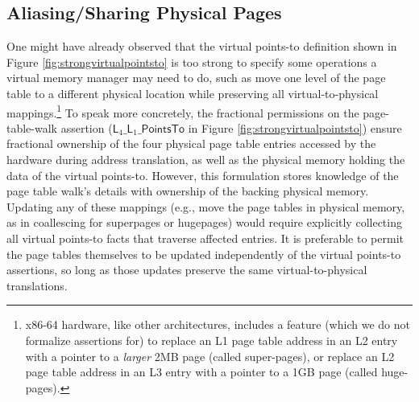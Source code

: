 \subsection{Aliasing/Sharing Physical Pages}
  \label{sec:sharingpages}  
  One might have already observed that the virtual points-to definition shown in Figure \ref{fig:strongvirtualpointsto} 
  is too strong to specify some operations a virtual memory manager may need to do, such as
  move one level of the page table to a different physical location while preserving all virtual-to-physical mappings.\footnote{
    x86-64 hardware, like other architectures, includes a feature (which we do not formalize assertions for) to
    replace an L1 page table address in an L2 entry with a pointer to a \emph{larger} 2MB page (called super-pages), 
    or replace an L2 page table address in an L3 entry with a pointer to a 1GB page (called huge-pages).
  }
   To speak more concretely, the fractional permissions on the page-table-walk assertion ($\textsf{L}_{4}\_\textsf{L}_{1}\_\textsf{PointsTo}$ in Figure \ref{fig:strongvirtualpointsto}) 
  ensure fractional ownership of the four physical page table entries accessed by the hardware during address translation,
  as well as the physical memory holding the data of the virtual points-to.
  However, this formulation stores knowledge of the page table walk's details with ownership of the backing physical
  memory.
  Updating any of these mappings (e.g., move the page tables in physical memory, as in coallescing for
  superpages or hugepages)
  would require explicitly collecting all virtual points-to facts that traverse affected entries.
  It is preferable to permit the page tables themselves to be updated independently of the virtual points-to assertions,
  so long as those updates preserve the same virtual-to-physical translations.
\newcommand{\vale}{\textsf{val}}
